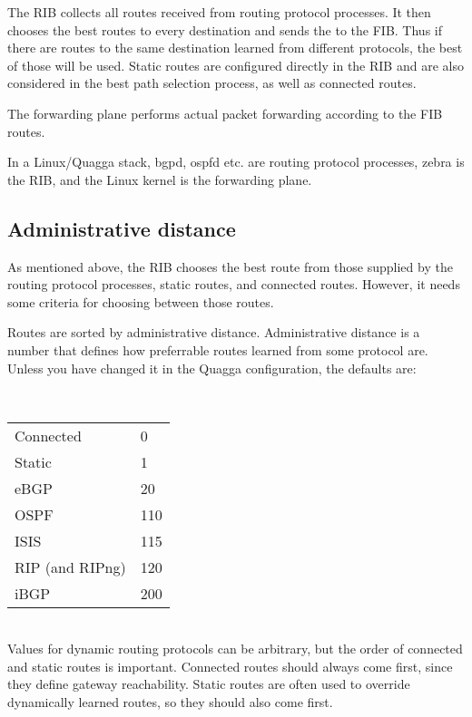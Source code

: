The RIB collects all routes received from routing protocol processes. It then chooses the best
routes to every destination and sends the to the FIB. Thus if there are routes to the same
destination learned from different protocols, the best of those will be used. Static routes
are configured directly in the RIB and are also considered in the best path selection process,
as well as connected routes.

The forwarding plane performs actual packet forwarding according to the FIB routes.

In a Linux/Quagga stack, bgpd, ospfd etc. are routing protocol processes, zebra is the RIB,
and the Linux kernel is the forwarding plane.

\subsection{Administrative distance}

As mentioned above, the RIB chooses the best route from those supplied by the routing 
protocol processes, static routes, and connected routes. However, it needs some criteria
for choosing between those routes.

Routes are sorted by administrative distance. Administrative distance is a number that
defines how preferrable routes learned from some protocol are. Unless you have changed it
in the Quagga configuration, the defaults are:

\ \\

\noindent{}\begin{tabular}{ll}
\hline
Connected & 0 \\
Static & 1 \\
eBGP & 20 \\
OSPF & 110 \\
ISIS & 115 \\
RIP (and RIPng) & 120 \\
iBGP & 200 \\
\hline
\end{tabular}

\ \\

Values for dynamic routing protocols can be arbitrary, but the order of connected
and static routes is important. Connected routes should always come first, since
they define gateway reachability. Static routes are often used to override dynamically
learned routes, so they should also come first.

